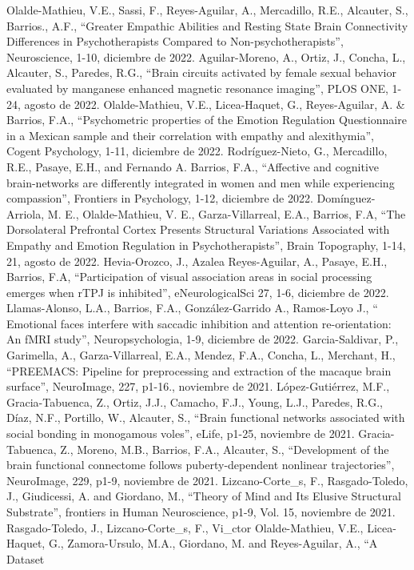 Olalde-Mathieu, V.E., Sassi, F., Reyes-Aguilar, A., Mercadillo, R.E., Alcauter, S., Barrios., A.F., “Greater Empathic Abilities and Resting State Brain 
Connectivity Differences in Psychotherapists Compared to Non-psychotherapists”, Neuroscience, 1-10,  diciembre de 2022.
Aguilar-Moreno, A., Ortiz, J., Concha, L., Alcauter, S., Paredes, R.G., “Brain circuits activated by female sexual behavior evaluated by manganese enhanced 
magnetic resonance imaging”, PLOS ONE, 1-24,  agosto de 2022. 
Olalde-Mathieu, V.E., Licea-Haquet, G., Reyes-Aguilar, A. & Barrios, F.A., “Psychometric properties of the Emotion Regulation Questionnaire in a Mexican 
sample and their correlation with empathy and alexithymia”, Cogent Psychology, 1-11,  diciembre de 2022.
Rodríguez-Nieto, G., Mercadillo, R.E., Pasaye, E.H., and Fernando A. Barrios, F.A., “Affective and cognitive brain-networks are differently integrated in 
women and men while experiencing compassion”, Frontiers in Psychology, 1-12,  diciembre de 2022.
Domínguez-Arriola, M. E., Olalde-Mathieu, V. E., Garza-Villarreal, E.A., Barrios, F.A, “The Dorsolateral Prefrontal Cortex Presents Structural Variations 
Associated with Empathy and Emotion Regulation in Psychotherapists”, Brain Topography, 1-14, 21,  agosto de 2022.
Hevia-Orozco, J., Azalea Reyes-Aguilar, A., Pasaye, E.H., Barrios, F.A, “Participation of visual association areas in social processing emerges when rTPJ is 
inhibited”, eNeurologicalSci 27, 1-6,  diciembre de 2022.
Llamas-Alonso, L.A., Barrios, F.A., González-Garrido A., Ramos-Loyo J., “ Emotional faces interfere with saccadic inhibition and attention re-orientation: 
An fMRI study”, Neuropsychologia, 1-9,  diciembre de 2022.
Garcia-Saldivar, P., Garimella, A., Garza-Villarreal, E.A., Mendez, F.A., Concha, L., Merchant, H., “PREEMACS: Pipeline for preprocessing and extraction of 
the macaque brain surface”, NeuroImage, 227, p1-16.,  noviembre de 2021.
López-Gutiérrez, M.F., Gracia-Tabuenca, Z., Ortiz, J.J., Camacho, F.J., Young, L.J., Paredes, R.G., Díaz, N.F., Portillo, W., Alcauter, S., “Brain 
functional networks associated with social bonding in monogamous voles”, eLife, p1-25,  noviembre de 2021.
Gracia-Tabuenca, Z., Moreno, M.B., Barrios, F.A., Alcauter, S., “Development of the brain functional connectome follows puberty-dependent nonlinear 
trajectories”, NeuroImage, 229, p1-9,  noviembre de 2021.
Lizcano-Corte_s, F., Rasgado-Toledo, J., Giudicessi, A. and Giordano, M., “Theory of Mind and Its Elusive Structural Substrate”, frontiers in Human 
Neuroscience, p1-9, Vol. 15,  noviembre de 2021.
Rasgado-Toledo, J., Lizcano-Corte_s, F., Vi_ctor Olalde-Mathieu, V.E., Licea-Haquet, G., Zamora-Ursulo, M.A., Giordano, M. and Reyes-Aguilar, A., “A Dataset 
